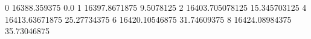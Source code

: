 0 16388.359375 0.0
1 16397.8671875 9.5078125
2 16403.705078125 15.345703125
4 16413.63671875 25.27734375
6 16420.10546875 31.74609375
8 16424.08984375 35.73046875
